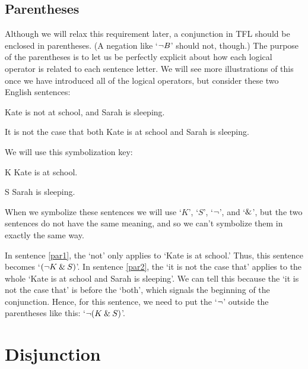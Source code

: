 \subsection{Parentheses}

Although we will relax this requirement later, a conjunction in TFL should be enclosed in parentheses. (A negation like `${\neg} B$' should not, though.) The purpose of the parentheses is to let us be perfectly explicit about how each logical operator is related to each sentence letter. We will see more illustrations of this once we have introduced all of the logical operators, but consider these two English sentences:
\begin{earg}
	\item[\ex{par1}] Kate is not at school, and Sarah is sleeping.
	\item[\ex{par2}] It is not the case that both Kate is at school and Sarah is sleeping.
\end{earg}

We will use this symbolization key:
	\begin{ekey}
		\item[K] Kate is at school.
		\item[S] Sarah is sleeping.
	\end{ekey}
When we symbolize these sentences we will use `$K$', `$S$', `${\neg}$', and `$\mathbin{\&}$', but the two sentences do not have the same meaning, and so we can't symbolize them in exactly the same way.

In sentence \ref{par1}, the `not' only applies to `Kate is at school.' Thus, this sentence becomes `$({\neg} K \mathbin{\&} S)$'. In sentence \ref{par2}, the `it is not the case that' applies to the whole `Kate is at school and Sarah is sleeping'. We can tell this because the `it is not the case that' is before the `both', which signals the beginning of the conjunction. Hence, for this sentence, we need to put the `${\neg}$' outside the parentheses like this: `${\neg} (K \mathbin{\&} S)$'.



\section{Disjunction}
\label{s:ConnectiveDisjunction}

